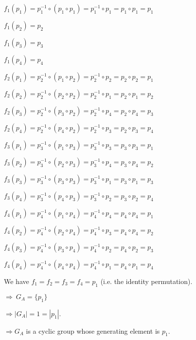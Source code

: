 \documentclass{article}
\begin{document}
\noindent
$f_1(p_1) = p_1^{-1} \circ (p_1 \circ p_1) = p_1^{-1} \circ p_1 = p_1 \circ p_1 = p_1$

\noindent
$f_1(p_2) = p_2$

\noindent
$f_1(p_3) = p_3$

\noindent
$f_1(p_4) = p_4$
\newline

\noindent
$f_2(p_1) = p_2^{-1} \circ (p_1 \circ p_2) = p_2^{-1} \circ p_2 = p_2 \circ p_2 = p_1$

\noindent
$f_2(p_2) = p_2^{-1} \circ (p_2 \circ p_2) = p_2^{-1} \circ p_1 = p_2 \circ p_1 = p_2$

\noindent
$f_2(p_3) = p_2^{-1} \circ (p_3 \circ p_2) = p_2^{-1} \circ p_4 = p_2 \circ p_4 = p_3$

\noindent
$f_2(p_4) = p_2^{-1} \circ (p_4 \circ p_2) = p_2^{-1} \circ p_3 = p_2 \circ p_3 = p_4$
\newline

\noindent
$f_3(p_1) = p_3^{-1} \circ (p_1 \circ p_3) = p_3^{-1} \circ p_3 = p_3 \circ p_3 = p_1$

\noindent
$f_3(p_2) = p_3^{-1} \circ (p_2 \circ p_3) = p_3^{-1} \circ p_4 = p_3 \circ p_4 = p_2$

\noindent
$f_3(p_3) = p_3^{-1} \circ (p_3 \circ p_3) = p_3^{-1} \circ p_1 = p_3 \circ p_1 = p_3$

\noindent
$f_3(p_4) = p_3^{-1} \circ (p_4 \circ p_3) = p_3^{-1} \circ p_2 = p_3 \circ p_2 = p_4$
\newline

\noindent
$f_4(p_1) = p_4^{-1} \circ (p_1 \circ p_4) = p_4^{-1} \circ p_4 = p_4 \circ p_4 = p_1$

\noindent
$f_4(p_2) = p_4^{-1} \circ (p_2 \circ p_4) = p_4^{-1} \circ p_3 = p_4 \circ p_4 = p_2$

\noindent
$f_4(p_3) = p_4^{-1} \circ (p_3 \circ p_4) = p_4^{-1} \circ p_2 = p_4 \circ p_2 = p_3$

\noindent
$f_4(p_4) = p_4^{-1} \circ (p_4 \circ p_4) = p_4^{-1} \circ p_1 = p_4 \circ p_1 = p_4$
\newline

\noindent
We have $f_1 = f_2 = f_3 = f_4 = p_1$ (i.e. the identity permutation).

$\Rightarrow \ G_A = \{ p_1 \}$ 

$\Rightarrow |G_A| = 1 = |p_1|$.

$\Rightarrow G_A$ is a cyclic group whose generating element is $p_1$.
\newline
\end{document}
